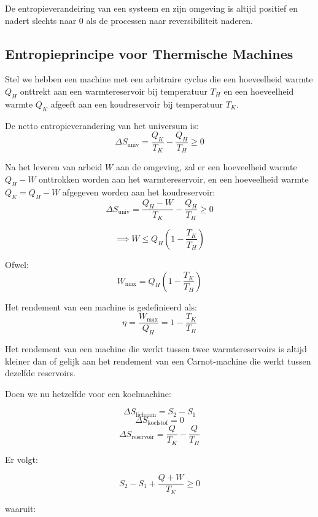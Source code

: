\begin{postulate}
    De entropieverandeiring van een systeem en zijn omgeving is altijd positief en nadert slechts naar 0 als de processen naar reversibiliteit naderen.
\end{postulate} 

\subsection{Entropieprincipe voor Thermische Machines}

Stel we hebben een machine met een arbitraire cyclus die een hoeveelheid warmte \(Q_H\) onttrekt aan een warmtereservoir bij temperatuur \(T_H\) en een hoeveelheid warmte \(Q_K\) afgeeft aan een koudreservoir bij temperatuur \(T_K\).

De netto entropieverandering van het universum is:
\[\Delta S_{\text{univ}} = \frac{Q_K}{T_K} - \frac{Q_H}{T_H} \geq 0\]

Na het leveren van arbeid \(W\) aan de omgeving, zal er een hoeveelheid warmte \(Q_H - W\) onttrokken worden aan het warmtereservoir, en een hoeveelheid warmte \(Q_K = Q_H - W\) afgegeven worden aan het koudreservoir:
\[\Delta S_{\text{univ}} = \frac{Q_H - W}{T_K} - \frac{Q_H}{T_H} \geq 0\] 

\[\implies W \leq Q_H \left(1 - \frac{T_K}{T_H}\right)\]

Ofwel:
\begin{equation}
\label{eq:W_max}
W_{\text{max}} = Q_H \left(1 - \frac{T_K}{T_H}\right)
\end{equation}  

Het rendement van een machine is gedefinieerd als: 
\[\eta = \frac{W_{\text{max}}}{Q_H} = 1 - \frac{T_K}{T_H}\]

\begin{postulate}
    Het rendement van een machine die werkt tussen twee warmtereservoirs is altijd kleiner dan of gelijk aan het rendement van een Carnot-machine die werkt tussen dezelfde reservoirs.
\end{postulate}

Doen we nu hetzelfde voor een koelmachine:

\[\Delta S_{\text{lichaam}} = S_2 - S_1\]
\[\Delta S_{\text{koelstof}} = 0\]
\[\Delta S_{\text{reservoir}} = \frac{Q}{T_K} - \frac{Q}{T_H}\]

Er volgt:

\[
S_2-S_1 + \frac{Q + W }{T_K} \geq 0
\]

waaruit:

